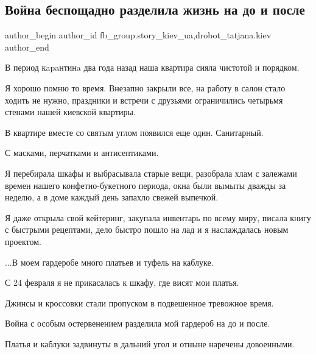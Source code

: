  
 
 
 
 
 
\subsection{Война беспощадно разделила жизнь на до и после}
\label{sec:21_11_2022.fb.fb_group.story_kiev_ua.1.vojna_zhizn}
 
\ifcmt
 author_begin
   author_id fb_group.story_kiev_ua,drobot_tatjana.kiev
 author_end
\fi

В период кapaнтинa два года назад наша квартира сияла чистотой и порядком. 

Я хорошо помню то время. Внезапно закрыли все, на работу в салон стало ходить
не нужно, праздники и встречи с друзьями ограничились четырьмя стенами нашей
киевской квартиры. 

В квартире вместе со святым углом появился еще один. Санитарный. 

С масками, перчатками и антисептиками.

Я перебирала шкафы и выбрасывала старые вещи, разобрала хлам с залежами времен
нашего конфетно-букетного периода, окна были вымыты дважды за неделю, а в доме
каждый день запахло свежей выпечкой. 


Я даже открыла свой кейтеринг, закупала инвентарь по всему миру, писала книгу с
быстрыми рецептами, дело быстро пошло на лад и я наслаждалась новым проектом.

...В моем гардеробе много платьев и туфель на каблуке. 

С 24 февраля я не прикасалась к шкафу, где висят мои платья.

Джинсы и кроссовки стали пропуском в подвешенное тревожное время. 

Война с особым остервенением разделила мой гардероб на до и после. 

Платья и каблуки задвинуты в дальний угол и отныне наречены довоенными. 

